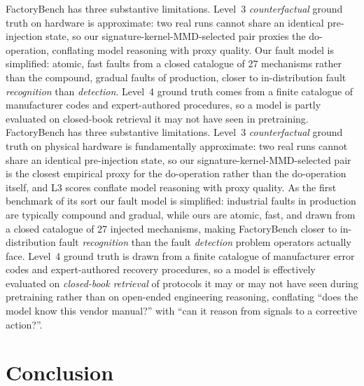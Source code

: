 \ifworkshopcompact
FactoryBench has three substantive limitations. Level~3 \emph{counterfactual} ground truth on hardware is approximate: two real runs cannot share an identical pre-injection state, so our signature-kernel-MMD-selected pair proxies the do-operation, conflating model reasoning with proxy quality. Our fault model is simplified: atomic, fast faults from a closed catalogue of 27 mechanisms rather than the compound, gradual faults of production, closer to in-distribution fault \emph{recognition} than \emph{detection}. Level~4 ground truth comes from a finite catalogue of manufacturer codes and expert-authored procedures, so a model is partly evaluated on closed-book retrieval it may not have seen in pretraining.
\else
FactoryBench has three substantive limitations. Level~3 \emph{counterfactual} ground truth on physical hardware is fundamentally approximate: two real runs cannot share an identical pre-injection state, so our signature-kernel-MMD-selected pair is the closest empirical proxy for the do-operation rather than the do-operation itself, and L3 scores conflate model reasoning with proxy quality. As the first benchmark of its sort our fault model is simplified: industrial faults in production are typically compound and gradual, while ours are atomic, fast, and drawn from a closed catalogue of 27 injected mechanisms, making FactoryBench closer to in-distribution fault \emph{recognition} than the fault \emph{detection} problem operators actually face. Level~4 ground truth is drawn from a finite catalogue of manufacturer error codes and expert-authored recovery procedures, so a model is effectively evaluated on \emph{closed-book retrieval} of protocols it may or may not have seen during pretraining rather than on open-ended engineering reasoning, conflating ``does the model know this vendor manual?'' with ``can it reason from signals to a corrective action?''.
\fi

\section{Conclusion}

